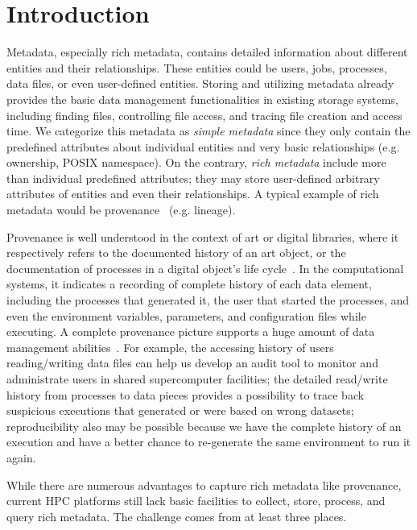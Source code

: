 \section{Introduction}

Metadata, especially rich metadata, contains detailed information about different entities and their relationships. These entities could be users, jobs, processes, data files, or even user-defined entities. Storing and utilizing metadata already provides the basic data management functionalities in existing storage systems, including finding files, controlling file access, and tracing file creation and access time. We categorize this metadata as \textit{simple metadata} since they only contain the predefined attributes about individual entities and very basic relationships (e.g. ownership, POSIX namespace). On the contrary, \textit{rich metadata} include more than individual predefined attributes; they may store user-defined arbitrary attributes of entities and even their relationships. A typical example of rich metadata would be provenance~\cite{provenwiki} (e.g. lineage). 

Provenance is well understood in the context of art or digital libraries, where it respectively refers to the documented history of an art object, or the documentation of processes in a digital object's life cycle~\cite{moreau2011open}. In the computational systems, it indicates a recording of complete history of each data element, including the processes that generated it, the user that started the processes, and even the environment variables, parameters, and configuration files while executing. A complete provenance picture supports a huge amount of data management abilities~\cite{simmhan2005survey, silva2007provenance}. For example, the  accessing history of users reading/writing data files can help us develop an audit tool to monitor and administrate users in shared supercomputer facilities; the detailed read/write history from processes to data pieces provides a possibility to trace back suspicious executions that generated or were based on wrong datasets; reproducibility also may be possible because we have the complete history of an execution and have a better chance to re-generate the same environment to run it again. 

While there are numerous advantages to capture rich metadata like provenance, current HPC platforms still lack basic facilities to collect, store, process, and query rich metadata. The challenge comes from at least three places.

